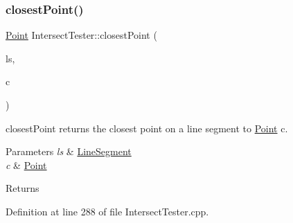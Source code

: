 \subsubsection{\texorpdfstring{closest\+Point()}{closestPoint()}}
{\footnotesize\ttfamily \hyperlink{class_point}{Point} Intersect\+Tester\+::closest\+Point (\begin{DoxyParamCaption}\item[{\hyperlink{class_line_segment}{Line\+Segment}}]{ls,  }\item[{\hyperlink{class_point}{Point}}]{c }\end{DoxyParamCaption})\hspace{0.3cm}{\ttfamily [static]}}



closest\+Point returns the closest point on a line segment to \hyperlink{class_point}{Point} c. 


\begin{DoxyParams}{Parameters}
{\em ls} & \hyperlink{class_line_segment}{Line\+Segment} \\
\hline
{\em c} & \hyperlink{class_point}{Point} \\
\hline
\end{DoxyParams}
\begin{DoxyReturn}{Returns}

\end{DoxyReturn}


Definition at line 288 of file Intersect\+Tester.\+cpp.


